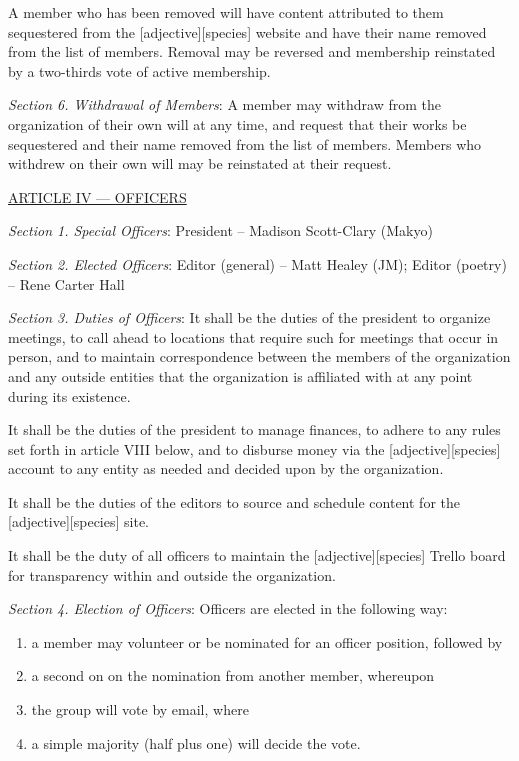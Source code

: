 \documentclass{article}
\begin{document}
A member who has been removed will have content attributed to them sequestered from the [adjective][species] website and have their name removed from the list of members.  Removal may be reversed and membership reinstated by a two-thirds vote of active membership.

\emph{Section 6. Withdrawal of Members}: A member may withdraw from the organization of their own will at any time, and request that their works be sequestered and their name removed from the list of members.  Members who withdrew on their own will may be reinstated at their request.

\bigskip

\large{\underline{ARTICLE IV --- OFFICERS}}

\emph{Section 1. Special Officers}: President -- Madison Scott-Clary (Makyo)

\emph{Section 2. Elected Officers}: Editor (general) -- Matt Healey (JM); Editor (poetry) -- Rene Carter Hall

\emph{Section 3. Duties of Officers}: It shall be the duties of the president to organize meetings, to call ahead to locations that require such for meetings that occur in person, and to maintain correspondence between the members of the organization and any outside entities that the organization is affiliated with at any point during its existence.

It shall be the duties of the president to manage finances, to adhere to any rules set forth in article VIII below, and to disburse money via the [adjective][species] account to any entity as needed and decided upon by the organization.

It shall be the duties of the editors to source and schedule content for the [adjective][species] site.

It shall be the duty of all officers to maintain the [adjective][species] Trello board for transparency within and outside the organization.

\emph{Section 4. Election of Officers}: Officers are elected in the following way:
\begin{enumerate}
  \item a member may volunteer or be nominated for an officer position, followed by
  \item a second on on the nomination from another member, whereupon
  \item the group will vote by email, where
  \item a simple majority (half plus one) will decide the vote.
\end{enumerate}
\end{document}
